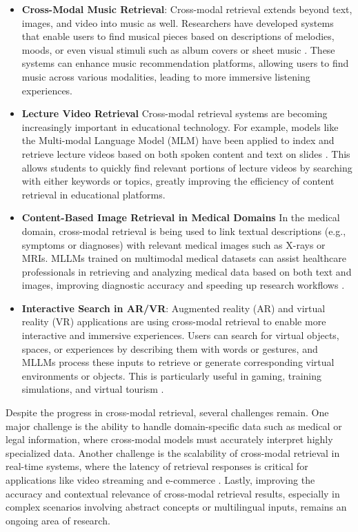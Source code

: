 \begin{itemize}
\item \textbf{Cross-Modal Music Retrieval}: Cross-modal retrieval extends beyond text, images, and video into music as well. Researchers have developed systems that enable users to find musical pieces based on descriptions of melodies, moods, or even visual stimuli such as album covers or sheet music \cite{vs2019muller}. These systems can enhance music recommendation platforms, allowing users to find music across various modalities, leading to more immersive listening experiences.

\item \textbf{Lecture Video Retrieval} Cross-modal retrieval systems are becoming increasingly important in educational technology. For example, models like the Multi-modal Language Model (MLM) have been applied to index and retrieve lecture videos based on both spoken content and text on slides \cite{vs2014chen}. This allows students to quickly find relevant portions of lecture videos by searching with either keywords or topics, greatly improving the efficiency of content retrieval in educational platforms.

\item \textbf{Content-Based Image Retrieval in Medical Domains} In the medical domain, cross-modal retrieval is being used to link textual descriptions (e.g., symptoms or diagnoses) with relevant medical images such as X-rays or MRIs. MLLMs trained on multimodal medical datasets can assist healthcare professionals in retrieving and analyzing medical data based on both text and images, improving diagnostic accuracy and speeding up research workflows \cite{vs2024jiang,vs2018dorfer}.

\item \textbf{Interactive Search in AR/VR}: Augmented reality (AR) and virtual reality (VR) applications are using cross-modal retrieval to enable more interactive and immersive experiences. Users can search for virtual objects, spaces, or experiences by describing them with words or gestures, and MLLMs process these inputs to retrieve or generate corresponding virtual environments or objects. This is particularly useful in gaming, training simulations, and virtual tourism \cite{vs2024li}.

\end{itemize}

Despite the progress in cross-modal retrieval, several challenges remain. One major challenge is the ability to handle domain-specific data such as medical or legal information, where cross-modal models must accurately interpret highly specialized data. Another challenge is the scalability of cross-modal retrieval in real-time systems, where the latency of retrieval responses is critical for applications like video streaming and e-commerce \cite{vs2024chang,vs2024gomez}. Lastly, improving the accuracy and contextual relevance of cross-modal retrieval results, especially in complex scenarios involving abstract concepts or multilingual inputs, remains an ongoing area of research.

